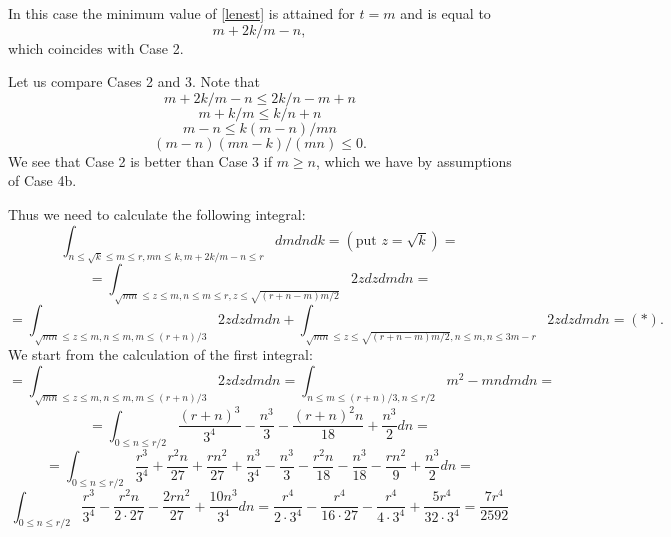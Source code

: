 \documentclass[11pt]{article}
\theoremstyle{Mystyle}
\begin{document}
In this case the minimum value of \eqref{lenest} is attained for $t=m$ and is equal to
$$m + 2k/m - n,$$
which coincides with Case 2.

Let us compare Cases 2 and 3. Note that 
$$m + 2k/m - n\leq 2k/n - m + n$$
$$m + k/m \leq k/n + n$$
$$m-n\leq k(m-n)/mn$$
$$(m-n)(mn-k)/(mn)\leq 0.$$
We see that Case 2 is better than Case 3 if $m\geq n$, which we have by assumptions of Case 4b.

Thus we need to calculate the following integral:
$$\int_{n\leq\sqrt{k}\leq m\leq r, mn\leq k, m + 2k/m - n\leq r}  dm dn dk = (\mbox{put } z=\sqrt{k}) = $$ 
$$=\int_{\sqrt{mn}\leq z\leq m, n\leq m\leq r,  z\leq \sqrt{(r+n-m)m/2}} 2zdz dm dn = $$
$$=\int_{\sqrt{mn}\leq z\leq m, n\leq m, m\leq (r+n)/3} 2z dz dm dn 
+ \int_{\sqrt{mn}\leq z\leq \sqrt{(r+n-m)m/2}, n\leq m, n\leq 3m-r} 2z dz dm dn = (*).$$
We start from the calculation of the first integral:
$$=\int_{\sqrt{mn}\leq z\leq m, n\leq m, m\leq (r+n)/3} 2z dz dm dn
= \int_{n\leq m\leq (r+n)/3, n\leq r/2} m^2 - mn dm dn = 
$$
$$= \int_{0\leq n\leq r/2} \frac{(r+n)^3}{3^4} - \frac{n^3}{3} - \frac{(r+n)^2n}{18} + \frac{n^3}{2} dn =$$
$$= \int_{0\leq n\leq r/2} \frac{r^3}{3^4} + \frac{r^2n}{27} + \frac{rn^2}{27} + \frac{n^3}{3^4} - \frac{n^3}{3} - \frac{r^2n}{18} - \frac{n^3}{18} - \frac{rn^2}{9} + \frac{n^3}{2} dn=
$$
\begin{equation}
\label{int3}
\int_{0\leq n\leq r/2} \frac{r^3}{3^4} - \frac{r^2n}{2\cdot 27} - \frac{2rn^2}{27} + \frac{10n^3}{3^4} dn = \frac{r^4}{2\cdot 3^4} - \frac{r^4}{16\cdot 27}
- \frac{r^4}{4\cdot 3^4} + \frac{5r^4}{32\cdot 3^4} = \frac{7r^4}{2592}
\end{equation}
\end{document}
